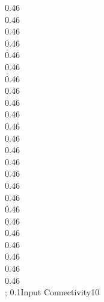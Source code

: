 {{0.46 \\
0.46 \\
0.46 \\
0.46 \\
0.46 \\
0.46 \\
0.46 \\
0.46 \\
0.46 \\
0.46 \\
0.46 \\
0.46 \\
0.46 \\
0.46 \\
0.46 \\
0.46 \\
0.46 \\
0.46 \\
0.46 \\
0.46 \\
0.46 \\
0.46 \\
0.46 \\
0.46 \\
};
}{0.1}{Input Connectivity}{10}
